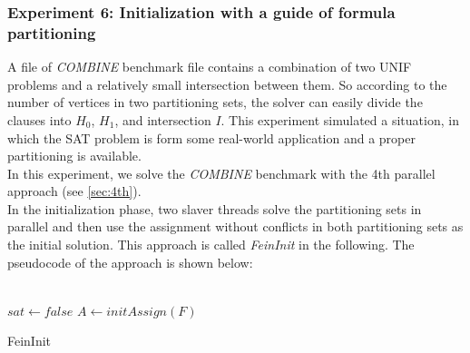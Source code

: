\documentclass[12pt,a4paper,twoside]{scrartcl}
\numberwithin{equation}{section}
\begin{document}
\subsubsection{Experiment 6: Initialization with a guide of formula partitioning} 
\label{sec:Experiment 6}
A file of  \emph{COMBINE}  benchmark file contains a combination of two UNIF problems and a relatively small intersection between them. So according to the number of vertices in two partitioning sets, the solver can easily divide the clauses into $H_0$, $H_1$, and intersection $I$. 
This experiment simulated a situation, in which the SAT problem is form some real-world application and a proper partitioning is available. \\
In this experiment, we solve the \emph{COMBINE} benchmark with the 4th parallel approach (see \ref{sec:4th}).\\ In the initialization phase, two slaver threads solve the partitioning sets in parallel and then use the assignment without conflicts in both partitioning sets as the initial solution. This approach is called \emph{FeinInit} in the following.
The pseudocode of the approach is shown below:\\
\\
\begin{algorithm}[H]
  $sat \leftarrow false$\;
  $A \leftarrow initAssign(F)$\;
 \caption{FeinInit}
\end{algorithm}  
\end{document}
